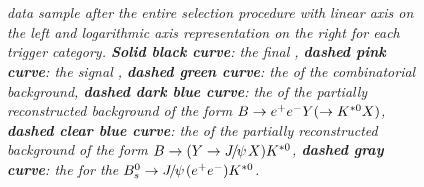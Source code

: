 \begin{figure}[!h]
\vspace*{-0.5cm}
\begin{center}
\\
\\
\end{center}
\caption{\textit{\BdToJPsieeKst \lhcb data sample after the entire selection procedure with linear axis on the left and logarithmic axis representation on the right for each trigger category. \textbf{Solid black curve}: the final \PDF , \textbf{dashed pink curve}: the signal \PDF, \textbf{dashed green curve}: the \PDF of the combinatorial background, \textbf{dashed dark blue curve}: the \PDF of the partially reconstructed background of the form $B \rightarrow e^+e^- Y(\rightarrow K^{*0} X)$, \textbf{dashed clear blue curve}: the \PDF of the partially reconstructed background of the form $B \rightarrow (Y \rightarrow \jpsi X) \Kstarz$, \textbf{dashed gray curve}: the \PDF for the $\Bs \rightarrow \jpsi (\epem) \Kstarz$.}}
\label{fig:jpsidata}
\vspace*{2cm}
\end{figure}


%
%


